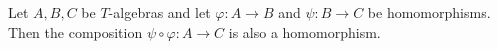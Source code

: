Let $A, B, C$ be $T$-algebras and let $\varphi: A \rightarrow B$ and $\psi: B \rightarrow C$ be homomorphisms. Then the composition $\psi \circ \varphi: A \rightarrow C$ is also a homomorphism.
